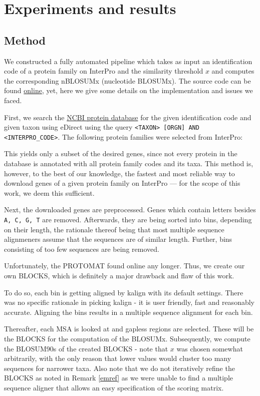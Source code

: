 \documentclass{article}
\begin{document}
\section{Experiments and results}
\subsection{Method}
We constructed a fully automated pipeline which takes as input an identification code of a protein
family on InterPro and the similarity threshold $x$ and computes the
corresponding nBLOSUMx (nucleotide BLOSUMx). The source code can be found \href{https://github.com}{online}, yet, here we
give some details on the implementation and issues we faced.

First, we search the \href{https://www.ncbi.nlm.nih.gov/protein}{NCBI protein
database} for the given identification code and given taxon using eDirect
using the query \texttt{<TAXON> [ORGN] AND <INTERPRO\_CODE>}.
The following protein families were selected from InterPro:
 
This yields only a subset of the desired genes, since not every
protein in the database is annotated with all protein family codes and its taxa. This method is,
however, to the best of our knowledge, the fastest and most reliable way to
download genes of a given protein family on InterPro --- for the scope of this
work, we deem this sufficient.

Next, the downloaded genes are preprocessed. Genes which contain letters 
besides \texttt{A, C, G, T} are removed. Afterwards, they are being sorted into bins,
depending on their length, the rationale thereof being that most multiple
sequence alignmeners assume that the sequences are of similar length. Further,
bins consisting of too few sequences are being removed.

Unfortunately, the PROTOMAT \cite{henikoffAutomatedAssemblyProtein1991} found online any longer. 
Thus, we create our own BLOCKS, which is definitely a major drawback and flaw of this work. 

To do so, each bin is getting aligned by kalign \cite{lassmannKalignAccurateFast2005} with
its default settings. There was no specific rationale in picking kalign - it is
user friendly, fast and reasonably accurate. Aligning the bins results
in a multiple sequence alignment for each bin.

Thereafter, each MSA is looked at and gapless regions are selected. 
These will be the BLOCKS for the computation of the BLOSUMx.
Subsequently, we compute the BLOSUM90s of the created BLOCKS - note that $x$
was chosen somewhat arbitrarily, with the only reason that lower values would
cluster too many sequences for narrower taxa. Also note
that we do not iteratively refine the BLOCKS as noted in Remark \ref{emref}
as we were unable to find a multiple sequence aligner that allows an easy specification
of the scoring matrix.
\end{document}
